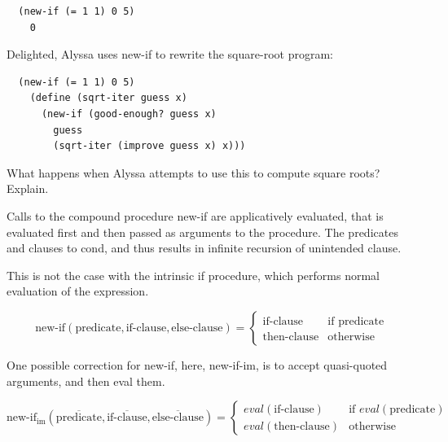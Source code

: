 \begin{verbatim}
  (new-if (= 1 1) 0 5)
    0
\end{verbatim}
\newline

Delighted, Alyssa uses new-if to rewrite the square-root program:
\newline

\begin{verbatim}
  (new-if (= 1 1) 0 5)
    (define (sqrt-iter guess x)
      (new-if (good-enough? guess x)
        guess
        (sqrt-iter (improve guess x) x)))
\end{verbatim}
\newline

What happens when Alyssa attempts to use this to compute square roots? Explain.
\newline

Calls to the compound procedure new-if are applicatively evaluated, that is evaluated first and then passed as arguments to the procedure.  The predicates and clauses to cond, and thus results in infinite recursion of unintended clause.
\newline

This is not the case with the intrinsic if procedure, which performs normal evaluation of the expression.
\newline

\begin{equation}
\mbox{new-if}\left(\mbox{predicate},\mbox{if-clause},\mbox{else-clause}\right) = 
\begin{cases}
\mbox{if-clause} & \mbox{if predicate} \\
\mbox{then-clause} & \mbox{otherwise}
\end{cases}
\label{eq:newif}
\end{equation}

One possible correction for new-if, here, new-if-im, is to accept quasi-quoted arguments, and then eval them.
\newline

\begin{equation}
\mbox{new-if}_{\mbox{im}}\left(\overline{\mbox{predicate}},\overline{\mbox{if-clause}},\overline{\mbox{else-clause}}\right) = 
\begin{cases}
eval\left(\mbox{if-clause}\right) & \mbox{if } eval\left(\mbox{predicate}\right) \\
eval\left(\mbox{then-clause}\right) & \mbox{otherwise}
\end{cases}
\label{eq:newif_improved}
\end{equation}

